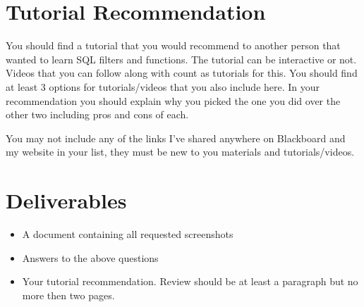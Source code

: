 \documentclass[12pt]{article}
\begin{document}
    \section*{Tutorial Recommendation}
You should find a tutorial that you would recommend to another person that wanted to learn SQL filters and functions.  The tutorial can be interactive or not.  Videos that you can follow along with count as tutorials for this. You should find at least 3 options for tutorials/videos that you also include here. In your recommendation you should explain why you picked the one you did over the other two including pros and cons of each. 

You may not include any of the links I've shared anywhere on Blackboard and my website in your list, they must be new to you materials and tutorials/videos. 


\section*{Deliverables}
\begin{itemize}
    \item A document containing all requested screenshots
    \item Answers to the above questions
    \item Your tutorial recommendation.  Review should be at least a paragraph but no more then two pages. 
\end{itemize} 
\end{document}
